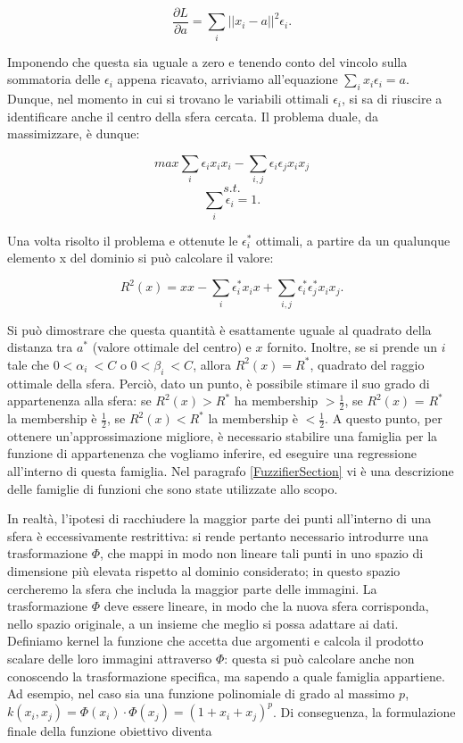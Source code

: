 \documentclass[12pt,a4paper]{report}
\begin{document}
\[ \frac{\partial L}{\partial a} = \sum_{i}||x_i - a||^2\epsilon_i.\]

Imponendo che questa sia uguale a zero e tenendo conto del vincolo sulla sommatoria delle $\epsilon_i$ appena ricavato,  arriviamo all'equazione  $\sum_{i}x_i\epsilon_i = a$. Dunque, nel momento in cui si trovano le variabili ottimali $\epsilon_i$, si sa di riuscire a identificare anche il centro della sfera cercata.
Il problema duale, da massimizzare, è dunque:

\[ max \sum_{i}\epsilon_ix_ix_i - \sum_{i,j}\epsilon_i\epsilon_jx_ix_j\]
\[s.t.\]
\[\sum_i\epsilon_i = 1.\]

Una volta risolto il problema e ottenute le $\epsilon_i^*$ ottimali, a partire da un qualunque elemento x del dominio si può calcolare il valore:

\[ R^2(x) = xx - \sum_{i}\epsilon_i^*x_ix + \sum_{i,j}\epsilon_i^*\epsilon_j^*x_ix_j.\]

Si può dimostrare che questa quantità è esattamente uguale al quadrato della distanza tra $a^*$ (valore ottimale del centro) e $x$ fornito. Inoltre,  se si prende un $i$ tale che $0 < \alpha_{i}\ < C$ o $0 < \beta_{i}\ < C$,  allora $R^2(x) = R^*$, quadrato del raggio ottimale della sfera.
Perciò, dato un punto, è possibile stimare il suo grado di appartenenza alla sfera: se $R^2(x) > R^*$ ha membership $>\frac{1}{2}$, se $R^2(x)$ = $R^*$ la membership è  $\frac{1}{2}$, se $R^2(x)  < R^*$ la membership è  $< \frac{1}{2}$.
A questo punto, per ottenere un'approssimazione migliore, è necessario stabilire una famiglia per la funzione di appartenenza che vogliamo inferire, ed eseguire una regressione all'interno di questa famiglia. Nel paragrafo \ref{FuzzifierSection} vi è una descrizione delle famiglie di funzioni che sono state utilizzate allo scopo.

In realtà, l'ipotesi di racchiudere la maggior parte dei punti all'interno di una sfera è eccessivamente restrittiva: si rende pertanto necessario introdurre una trasformazione  $\Phi$, che mappi in modo non lineare tali punti in uno spazio di dimensione più elevata rispetto al dominio considerato; in questo spazio cercheremo la sfera che includa la maggior parte delle immagini.
La trasformazione $\Phi$ deve essere lineare, in modo che la nuova sfera corrisponda, nello spazio originale, a un insieme che meglio si possa adattare ai dati. Definiamo kernel la funzione che accetta due argomenti e calcola il prodotto scalare delle loro immagini attraverso $\Phi$: questa si può calcolare anche non conoscendo la trasformazione specifica, ma sapendo a quale famiglia appartiene. Ad esempio, nel caso sia una funzione polinomiale di grado al massimo $p$, $k(x_i, x_j) = \Phi(x_i)\cdot \Phi(x_j) = (1 + x_i + x_j)^p$.
Di conseguenza, la formulazione finale della funzione obiettivo diventa
\end{document}
